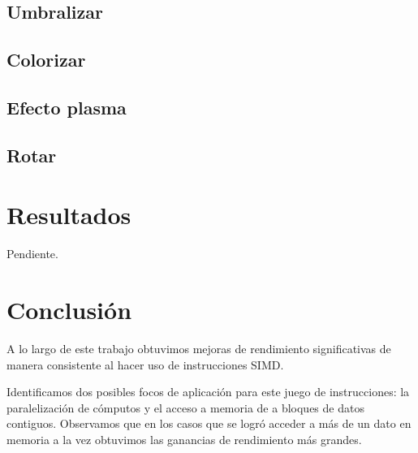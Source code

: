 \documentclass[a4paper,10pt,twoside]{article}
\begin{document}


\subsection{Umbralizar}



\subsection{Colorizar}



\subsection{Efecto plasma}



\subsection{Rotar}






\section{Resultados}

Pendiente.




\section{Conclusión}

A lo largo de este trabajo obtuvimos mejoras de rendimiento significativas de manera consistente al hacer uso de instrucciones SIMD. 

Identificamos dos posibles focos de aplicación para este juego de instrucciones: la paralelización de cómputos y el acceso a memoria de a bloques de datos contiguos. Observamos que en los casos que se logró acceder a más de un dato en memoria a la vez obtuvimos las ganancias de rendimiento más grandes.
\end{document}
